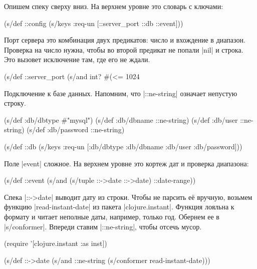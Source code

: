 \noindent
Опишем спеку сверху вниз. На верхнем уровне это словарь с ключами:

\begin{english}
  \begin{clojure}
(s/def ::config
  (s/keys :req-un [::server_port ::db ::event]))
  \end{clojure}
\end{english}

Порт сервера это комбинация двух предикатов: число и вхождение в диапазон.
Проверка на число нужна, чтобы во второй предикат не попали \spverb|nil| и
строка. Это вызовет исключение там, где его не ждали.

\begin{english}
  \begin{clojure}
(s/def ::server_port
  (s/and int? #(<= 1024 %
  \end{clojure}
\end{english}

\noindent
Подключение к базе данных. Напомним, что \spverb|::ne-string| означает
непустую строку.

\begin{english}
  \begin{clojure}
(s/def :db/dbtype   #{"mysql"})
(s/def :db/dbname   ::ne-string)
(s/def :db/user     ::ne-string)
(s/def :db/password ::ne-string)

(s/def ::db
  (s/keys :req-un [:db/dbtype
                   :db/dbname
                   :db/user
                   :db/password]))
  \end{clojure}
\end{english}

Поле \spverb|event| сложное. На верхнем уровне это кортеж дат и проверка
диапазона:

\begin{english}
  \begin{clojure}
(s/def ::event
  (s/and (s/tuple ::->date ::->date)
         ::date-range))
  \end{clojure}
\end{english}

Спека \spverb|::->date| выводит дату из строки. Чтобы не парсить е\"{е} вручную,
возьмем функцию \spverb|read-instant-date| из пакета \spverb|clojure.instant|.
Функция лояльна к формату и читает неполные даты, например, только год.
Обернем ее в \spverb|s/conformer|. Впереди ставим \spverb|::ne-string|,
чтобы отсечь мусор.

\begin{english}
  \begin{clojure}
(require '[clojure.instant :as inst])

(s/def ::->date
  (s/and ::ne-string (s/conformer read-instant-date)))
  \end{clojure}
\end{english}

